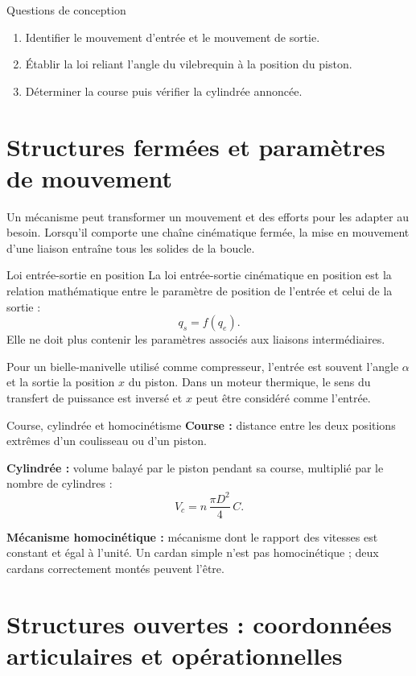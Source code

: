 \begin{TLThreeApp}{Questions de conception}
\begin{enumerate}
  \item Identifier le mouvement d'entrée et le mouvement de sortie.
  \item Établir la loi reliant l'angle du vilebrequin à la position du piston.
  \item Déterminer la course puis vérifier la cylindrée annoncée.
\end{enumerate}
\end{TLThreeApp}

\section{Structures fermées et paramètres de mouvement}
\label{sec:les-fermees}

Un mécanisme peut transformer un mouvement et des efforts pour les
adapter au besoin. Lorsqu'il comporte une chaîne cinématique fermée, la
mise en mouvement d'une liaison entraîne tous les solides de la boucle.

\begin{TLThreeDef}{Loi entrée-sortie en position}
La loi entrée-sortie cinématique en position est la relation
mathématique entre le paramètre de position de l'entrée et celui de la
sortie :
\[
q_s=f(q_e).
\]
Elle ne doit plus contenir les paramètres associés aux liaisons
intermédiaires.
\end{TLThreeDef}

Pour un bielle-manivelle utilisé comme compresseur, l'entrée est souvent
l'angle $\alpha$ et la sortie la position $x$ du piston. Dans un moteur
thermique, le sens du transfert de puissance est inversé et $x$ peut
être considéré comme l'entrée.

\begin{TLThreeDef}{Course, cylindrée et homocinétisme}
\textbf{Course :} distance entre les deux positions extrêmes d'un
coulisseau ou d'un piston.

\textbf{Cylindrée :} volume balayé par le piston pendant sa course,
multiplié par le nombre de cylindres :
\[
V_c=n\,\frac{\pi D^2}{4}\,C.
\]

\textbf{Mécanisme homocinétique :} mécanisme dont le rapport des vitesses
est constant et égal à l'unité. Un cardan simple n'est pas
homocinétique ; deux cardans correctement montés peuvent l'être.
\end{TLThreeDef}

\section{Structures ouvertes : coordonnées articulaires et opérationnelles}
\label{sec:les-ouvertes}

